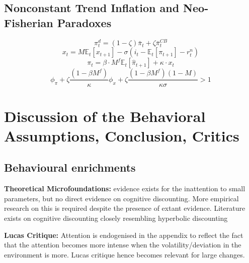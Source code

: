 \documentclass{beamer}
\newcommand\ReduceFont{\fontsize{10}{7.2}\selectfont}
\begin{document}
\subsection{Nonconstant Trend Inflation and Neo- Fisherian Paradoxes}
\begin{frame}{\subsecname}
    \begin{equation}\tag{59}
        \pi^{d}_{t}=(1-\zeta)\bar{\pi}_{t}+\zeta\bar{\pi}_{t}^{CB}
    \end{equation}
    \begin{equation}\tag{60}
        x_{t}=M\mathbb{E}_{t}\left[x_{t+1}\right]-\sigma\left(i_{t}-\mathbb{E}_{t}\left[\pi_{t+1}\right]-r^{n}_{t}\right)
    \end{equation}
    \begin{equation}\tag{61}
        \pi_{t}=\beta\cdot M^{f} \mathbb{E}_t\left[\hat{\pi}_{t+1}\right]+\kappa\cdot x_{t}
    \end{equation}
    \begin{equation}\tag{62}
        \phi_{\pi}+\zeta \frac{(1-\beta M^{f})}{\kappa}\phi_{x}+\zeta\frac{(1-\beta M^{f})(1-M)}{\kappa \sigma}>1
    \end{equation}
\end{frame}

\section{Discussion of the Behavioral Assumptions, Conclusion, Critics}
\begin{frame}
    \ReduceFont
\end{frame}

\begin{frame}
    \tableofcontents[currentsection, hideothersubsections, sections=\value{section}]
\end{frame}

\subsection{Behavioural enrichments}

\begin{frame}{\subsecname}
\textbf{Theoretical Microfoundations:} evidence exists for the inattention to small parameters, but no direct evidence on cognitive discounting. More empirical research on this is required despite the presence of extant evidence. Literature exists on cognitive discounting closely resembling hyperbolic discounting

\textbf{Lucas Critique:} Attention is endogenised in the appendix to reflect the fact that the attention becomes more intense when the volatility/deviation in the environment is more. Lucas critique hence becomes relevant for large changes. 

\end{frame}
\end{document}
